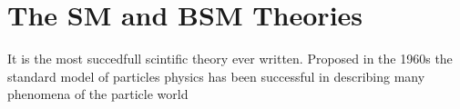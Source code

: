 \chapter{The SM and BSM Theories}\label{ch:smandbsm}

It is the most succedfull scintific theory ever written.  Proposed in the 1960s the standard model of particles physics has been successful in describing many phenomena of the particle world




{}





